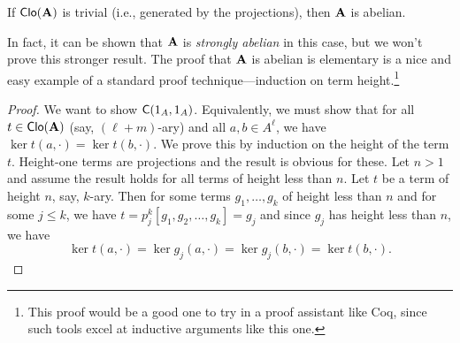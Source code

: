\begin{lem}
If $\operatorname{\mathsf{Clo}}(\mathbf{A})$ is trivial (i.e., generated by the projections),
then $\mathbf{A}$ is abelian.
\end{lem}
In fact, it can be shown that $\mathbf{A}$ is \emph{strongly abelian} in this case, but
we won't prove this stronger result. The proof that $\mathbf{A}$ is abelian is
elementary is a nice and easy example of a standard proof technique---induction on
term height.\footnote{This proof would be a good one to try in a proof assistant
  like Coq, since such tools excel at inductive arguments like this one.}
\begin{proof}
We want to show $\mathsf{C}(1_A, 1_A)$.  Equivalently, we must show
that for all $t\in \operatorname{\mathsf{Clo}}(\mathbf{A})$ (say, $(\ell+m)$-ary) 
and all $a, b \in A^\ell$, we have $\ker t(a,\cdot)=\ker t(b,\cdot)$.
We prove this by induction on the height of the term $t$.  Height-one terms are
projections and the result is obvious for these.  Let $n>1$ and assume the result
holds for all terms  of height less than
$n$.  Let $t$ be a term of height $n$, say, $k$-ary.  Then for some terms 
$g_1, \dots, g_k$ of height less than $n$ and for some $j\leq k$, we have
$t = p^k_j [g_1, g_2, \dots, g_k] = g_j$ and since $g_j$ has height less than
$n$, we have
\[
\ker t(a,\cdot)=\ker g_j(a,\cdot) = \ker g_j(b,\cdot)=\ker t(b,\cdot).
\]\end{proof}


